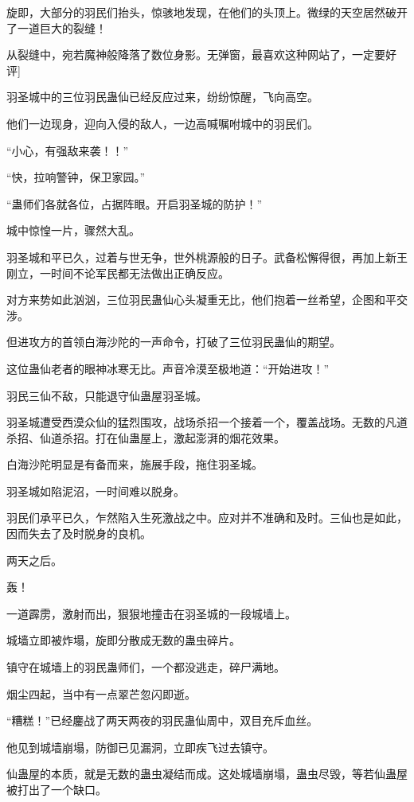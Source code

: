 \begin{this_body}
旋即，大部分的羽民们抬头，惊骇地发现，在他们的头顶上。微绿的天空居然破开了一道巨大的裂缝！

从裂缝中，宛若魔神般降落了数位身影。无弹窗，最喜欢这种网站了，一定要好评]

羽圣城中的三位羽民蛊仙已经反应过来，纷纷惊醒，飞向高空。

他们一边现身，迎向入侵的敌人，一边高喊嘱咐城中的羽民们。

“小心，有强敌来袭！！”

“快，拉响警钟，保卫家园。”

“蛊师们各就各位，占据阵眼。开启羽圣城的防护！”

城中惊惶一片，骤然大乱。

羽圣城和平已久，过着与世无争，世外桃源般的日子。武备松懈得很，再加上新王刚立，一时间不论军民都无法做出正确反应。

对方来势如此汹汹，三位羽民蛊仙心头凝重无比，他们抱着一丝希望，企图和平交涉。

但进攻方的首领白海沙陀的一声命令，打破了三位羽民蛊仙的期望。

这位蛊仙老者的眼神冰寒无比。声音冷漠至极地道：“开始进攻！”

羽民三仙不敌，只能退守仙蛊屋羽圣城。

羽圣城遭受西漠众仙的猛烈围攻，战场杀招一个接着一个，覆盖战场。无数的凡道杀招、仙道杀招。打在仙蛊屋上，激起澎湃的烟花效果。

白海沙陀明显是有备而来，施展手段，拖住羽圣城。

羽圣城如陷泥沼，一时间难以脱身。

羽民们承平已久，乍然陷入生死激战之中。应对并不准确和及时。三仙也是如此，因而失去了及时脱身的良机。

两天之后。

轰！

一道霹雳，激射而出，狠狠地撞击在羽圣城的一段城墙上。

城墙立即被炸塌，旋即分散成无数的蛊虫碎片。

镇守在城墙上的羽民蛊师们，一个都没逃走，碎尸满地。

烟尘四起，当中有一点翠芒忽闪即逝。

“糟糕！”已经鏖战了两天两夜的羽民蛊仙周中，双目充斥血丝。

他见到城墙崩塌，防御已见漏洞，立即疾飞过去镇守。

仙蛊屋的本质，就是无数的蛊虫凝结而成。这处城墙崩塌，蛊虫尽毁，等若仙蛊屋被打出了一个缺口。


\end{this_body}
